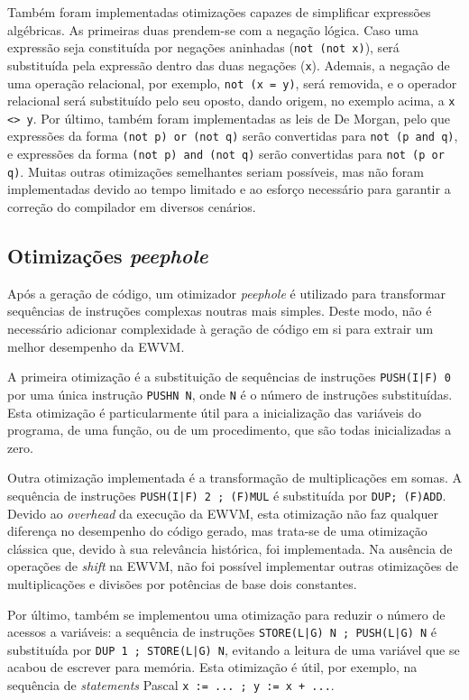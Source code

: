 \documentclass[12pt, a4paper]{article}
\begin{document}
Também foram implementadas otimizações capazes de simplificar expressões algébricas. As primeiras
duas prendem-se com a negação lógica. Caso uma expressão seja constituída por negações aninhadas
(\texttt{not (not x)}), será substituída pela expressão dentro das duas negações (\texttt{x}).
Ademais, a negação de uma operação relacional, por exemplo, \texttt{not (x = y)}, será removida, e o
operador relacional será substituído pelo seu oposto, dando origem, no exemplo acima, a
\texttt{x <> y}. Por último, também foram implementadas as leis de De Morgan, pelo que expressões
da forma \texttt{(not p) or (not q)} serão convertidas para \texttt{not (p and q)}, e expressões da
forma \texttt{(not p) and (not q)} serão convertidas para \texttt{not (p or q)}. Muitas outras
otimizações semelhantes seriam possíveis, mas não foram implementadas devido ao tempo limitado e ao
esforço necessário para garantir a correção do compilador em diversos cenários.

\subsection{Otimizações \emph{peephole}}
\label{peephole}

Após a geração de código, um otimizador \emph{peephole} é utilizado para transformar sequências de
instruções complexas noutras mais simples. Deste modo, não é necessário adicionar complexidade à
geração de código em si para extrair um melhor desempenho da EWVM.

A primeira otimização é a substituição de sequências de instruções \texttt{PUSH(I|F) 0} por uma
única instrução \texttt{PUSHN N}, onde \texttt{N} é o número de instruções substituídas. Esta
otimização é particularmente útil para a inicialização das variáveis do programa, de uma função, ou
de um procedimento, que são todas inicializadas a zero.

Outra otimização implementada é a transformação de multiplicações em somas. A sequência de
instruções \texttt{PUSH(I|F) 2 ; (F)MUL} é substituída por \texttt{DUP; (F)ADD}. Devido ao
\emph{overhead} da execução da EWVM, esta otimização não faz qualquer diferença no desempenho do
código gerado, mas trata-se de uma otimização clássica que, devido à sua relevância histórica, foi
implementada. Na ausência de operações de \emph{shift} na EWVM, não foi possível implementar outras
otimizações de multiplicações e divisões por potências de base dois constantes.

Por último, também se implementou uma otimização para reduzir o número de acessos a variáveis: a
sequência de instruções \texttt{STORE(L|G) N ; PUSH(L|G) N} é substituída por
\texttt{DUP 1 ; STORE(L|G) N}, evitando a leitura de uma variável que se acabou de escrever para
memória. Esta otimização é útil, por exemplo, na sequência de \emph{statements} Pascal
\texttt{x := ... ; y := x + ...}.
\end{document}
